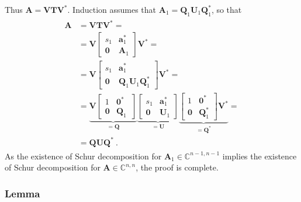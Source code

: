 \documentclass[letterpaper,10pt,english]{jupyterBook}
\begin{document}
\sphinxAtStartPar
Thus \(\mathbf{A} = \mathbf{V} \mathbf{T} \mathbf{V}^*\). Induction assumes that \(\mathbf{A}_1 = \mathbf{Q}_1 \mathbf{U}_1 \mathbf{Q}_1^*\), so that
\begin{equation*}
\begin{split}\begin{aligned}
  \mathbf{A} 
  & = \mathbf{V} \mathbf{T} \mathbf{V}^* = \\
  & = \mathbf{V} \begin{bmatrix} s_1 & \mathbf{a}_1^* \\ \mathbf{0} & \mathbf{A}_1 \end{bmatrix} \mathbf{V}^* = \\
  & = \mathbf{V} \begin{bmatrix} s_1 & \mathbf{a}_1^* \\ \mathbf{0} & \mathbf{Q}_1 \mathbf{U}_1 \mathbf{Q}_1^* \end{bmatrix} \mathbf{V}^* = \\
  & = \underbrace{\mathbf{V} \begin{bmatrix} 1 & \mathbf{0}^* \\ \mathbf{0} & \mathbf{Q}_1 \ \end{bmatrix}}_{=\mathbf{Q}} \underbrace{\begin{bmatrix} s_1 & \mathbf{a}_1^* \\ \mathbf{0} & \mathbf{U}_1 \end{bmatrix}}_{= \mathbf{U}} \underbrace{\begin{bmatrix} 1 & \mathbf{0}^* \\ \mathbf{0} & \mathbf{Q}_1^* \end{bmatrix} \mathbf{V}^*}_{=\mathbf{Q}^*} = \\
  & = \mathbf{Q} \mathbf{U} \mathbf{Q}^* \ .
\end{aligned}\end{split}
\end{equation*}
\sphinxAtStartPar
As the existence of Schur decomposition for \(\mathbf{A}_1 \in \mathbb{C}^{n-1,n-1}\) implies the existence of Schur decomposition for \(\mathbf{A} \in \mathbb{C}^{n,n}\), the proof is complete.
\subsubsection*{Lemma}
\end{document}
